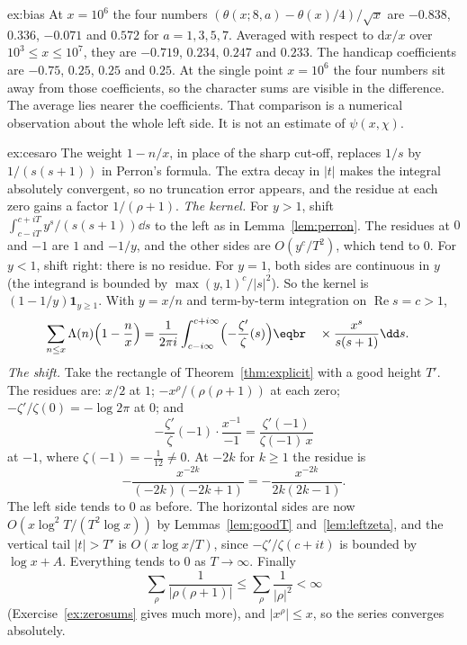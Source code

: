 \begin{solution}{ex:bias}
At $x=10^6$ the four numbers $(\theta(x;8,a)-\theta(x)/4)/\sqrt x$ are $-0.838$, $0.336$, $-0.071$ and $0.572$ for $a=1,3,5,7$. Averaged with respect to $\mathrm dx/x$ over $10^3\le x\le10^7$, they are $-0.719$, $0.234$, $0.247$ and $0.233$. The handicap coefficients are $-0.75$, $0.25$, $0.25$ and $0.25$. At the single point $x=10^6$ the four numbers sit away from those coefficients, so the character sums are visible in the difference. The average lies nearer the coefficients. That comparison is a numerical observation about the whole left side. It is not an estimate of $\psi(x,\chi)$.
\end{solution}

\begin{solution}{ex:cesaro}
\idea The weight $1-n/x$, in place of the sharp cut-off, replaces $1/s$ by $1/(s(s+1))$ in Perron's formula. The extra decay in $|t|$ makes the integral absolutely convergent, so no truncation error appears, and the residue at each zero gains a factor $1/(\rho+1)$.
\writeup \emph{The kernel.} For $y>1$, shift $\int_{c-iT}^{c+iT} y^s/(s(s+1))\dd s$ to the left as in Lemma~\ref{lem:perron}. The residues at $0$ and $-1$ are $1$ and $-1/y$, and the other sides are $O(y^c/T^2)$, which tend to $0$. For $y<1$, shift right: there is no residue. For $y=1$, both sides are continuous in $y$ (the integrand is bounded by $\max(y,1)^c/|s|^2$). So the kernel is $(1-1/y)\mathbf1_{y\ge1}$. With $y=x/n$ and term-by-term integration on $\operatorname{Re}s=c>1$,
\[
\begin{aligned}\sum_{n\le x}\Lambda(n)\Bigl(1-\frac nx\Bigr)&=\frac1{2\pi i}\int_{c-i\infty}^{c+i\infty}\Bigl(-\frac{\zeta'}\zeta(s)\Bigr)\eqbr\quad\times\frac{x^s}{s(s+1)}\dd s.\end{aligned}
\]
\emph{The shift.} Take the rectangle of Theorem~\ref{thm:explicit} with a good height $T'$. The residues are: $x/2$ at $1$; $-x^\rho/(\rho(\rho+1))$ at each zero; $-\zeta'/\zeta(0)=-\log2\pi$ at $0$; and
\[
-\frac{\zeta'}\zeta(-1)\cdot\frac{x^{-1}}{-1}=\frac{\zeta'(-1)}{\zeta(-1)\,x}
\]
at $-1$, where $\zeta(-1)=-\frac1{12}\ne0$. At $-2k$ for $k\ge1$ the residue is
\[
-\frac{x^{-2k}}{(-2k)(-2k+1)}=-\frac{x^{-2k}}{2k(2k-1)}.
\]
The left side tends to $0$ as before. The horizontal sides are now $O(x\log^2T/(T^2\log x))$ by Lemmas~\ref{lem:goodT} and~\ref{lem:leftzeta}, and the vertical tail $|t|>T'$ is $O(x\log x/T)$, since $-\zeta'/\zeta(c+it)$ is bounded by $\log x+A$. Everything tends to $0$ as $T\to\infty$. Finally
\[
\sum_\rho\frac1{|\rho(\rho+1)|}\le\sum_\rho\frac1{|\rho|^2}<\infty
\]
(Exercise~\ref{ex:zerosums} gives much more), and $|x^\rho|\le x$, so the series converges absolutely.
\end{solution}

